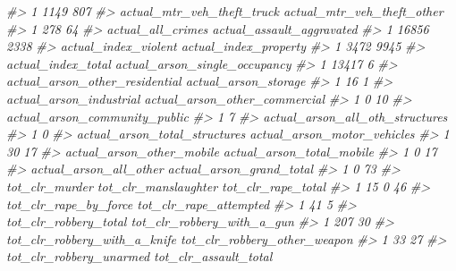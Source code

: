 \documentclass[
]{krantz}
\makeatletter
\newenvironment{Shaded}{\begin{snugshade}}{\end{snugshade}}
\newcommand{\CommentTok}[1]{\textcolor[rgb]{0.37,0.37,0.37}{\textit{#1}}}
\newenvironment{kframe}{%
\medskip{}
\setlength{\fboxsep}{.8em}
 \def\at@end@of@kframe{}%
 \ifinner\ifhmode%
  \def\at@end@of@kframe{\end{minipage}}%
  \begin{minipage}{\columnwidth}%
 \fi\fi%
 \def\FrameCommand##1{\hskip\@totalleftmargin \hskip-\fboxsep
 \colorbox{shadecolor}{##1}\hskip-\fboxsep
     \hskip-\linewidth \hskip-\@totalleftmargin \hskip\columnwidth}%
 \MakeFramed {\advance\hsize-\width
   \@totalleftmargin\z@ \linewidth\hsize
   \@setminipage}}%
 {\par\unskip\endMakeFramed%
 \at@end@of@kframe}
\renewenvironment{Shaded}{\begin{kframe}}{\end{kframe}}
\makeatother
\begin{document}
\begin{Shaded}
\begin{Highlighting}[]
\CommentTok{\#\textgreater{} 1                       1149                      807}
\CommentTok{\#\textgreater{}   actual\_mtr\_veh\_theft\_truck actual\_mtr\_veh\_theft\_other}
\CommentTok{\#\textgreater{} 1                        278                         64}
\CommentTok{\#\textgreater{}   actual\_all\_crimes actual\_assault\_aggravated}
\CommentTok{\#\textgreater{} 1             16856                      2338}
\CommentTok{\#\textgreater{}   actual\_index\_violent actual\_index\_property}
\CommentTok{\#\textgreater{} 1                 3472                  9945}
\CommentTok{\#\textgreater{}   actual\_index\_total actual\_arson\_single\_occupancy}
\CommentTok{\#\textgreater{} 1              13417                             6}
\CommentTok{\#\textgreater{}   actual\_arson\_other\_residential actual\_arson\_storage}
\CommentTok{\#\textgreater{} 1                             16                    1}
\CommentTok{\#\textgreater{}   actual\_arson\_industrial actual\_arson\_other\_commercial}
\CommentTok{\#\textgreater{} 1                       0                            10}
\CommentTok{\#\textgreater{}   actual\_arson\_community\_public}
\CommentTok{\#\textgreater{} 1                             7}
\CommentTok{\#\textgreater{}   actual\_arson\_all\_oth\_structures}
\CommentTok{\#\textgreater{} 1                               0}
\CommentTok{\#\textgreater{}   actual\_arson\_total\_structures actual\_arson\_motor\_vehicles}
\CommentTok{\#\textgreater{} 1                            30                          17}
\CommentTok{\#\textgreater{}   actual\_arson\_other\_mobile actual\_arson\_total\_mobile}
\CommentTok{\#\textgreater{} 1                         0                        17}
\CommentTok{\#\textgreater{}   actual\_arson\_all\_other actual\_arson\_grand\_total}
\CommentTok{\#\textgreater{} 1                      0                       73}
\CommentTok{\#\textgreater{}   tot\_clr\_murder tot\_clr\_manslaughter tot\_clr\_rape\_total}
\CommentTok{\#\textgreater{} 1             15                    0                 46}
\CommentTok{\#\textgreater{}   tot\_clr\_rape\_by\_force tot\_clr\_rape\_attempted}
\CommentTok{\#\textgreater{} 1                    41                      5}
\CommentTok{\#\textgreater{}   tot\_clr\_robbery\_total tot\_clr\_robbery\_with\_a\_gun}
\CommentTok{\#\textgreater{} 1                   207                         30}
\CommentTok{\#\textgreater{}   tot\_clr\_robbery\_with\_a\_knife tot\_clr\_robbery\_other\_weapon}
\CommentTok{\#\textgreater{} 1                           33                           27}
\CommentTok{\#\textgreater{}   tot\_clr\_robbery\_unarmed tot\_clr\_assault\_total}

\end{Highlighting}
\end{Shaded}
\end{document}
